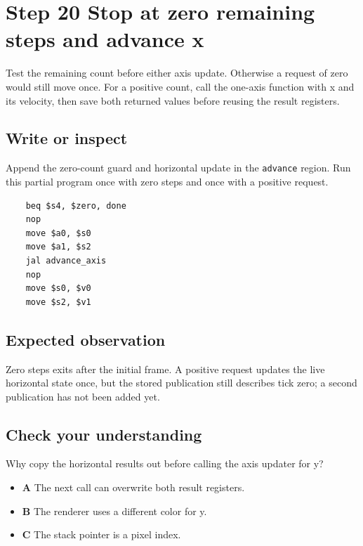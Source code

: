 \section{Step 20 Stop at zero remaining steps and advance x}\label{ball-s20}

Test the remaining count before either axis update. Otherwise a request of zero would still move once. For a positive count, call the one-axis function with x and its velocity, then save both returned values before reusing the result registers.

\subsection{Write or inspect}
Append the zero-count guard and horizontal update in the \texttt{advance} region. Run this partial program once with zero steps and once with a positive request.

\begin{verbatim}
    beq $s4, $zero, done
    nop
    move $a0, $s0
    move $a1, $s2
    jal advance_axis
    nop
    move $s0, $v0
    move $s2, $v1
\end{verbatim}

\subsection{Expected observation}
Zero steps exits after the initial frame. A positive request updates the live horizontal state once, but the stored publication still describes tick zero; a second publication has not been added yet.

\subsection{Check your understanding}
Why copy the horizontal results out before calling the axis updater for y?

\begin{itemize}
  \item \textbf{A} The next call can overwrite both result registers.
  \item \textbf{B} The renderer uses a different color for y.
  \item \textbf{C} The stack pointer is a pixel index.
\end{itemize}
